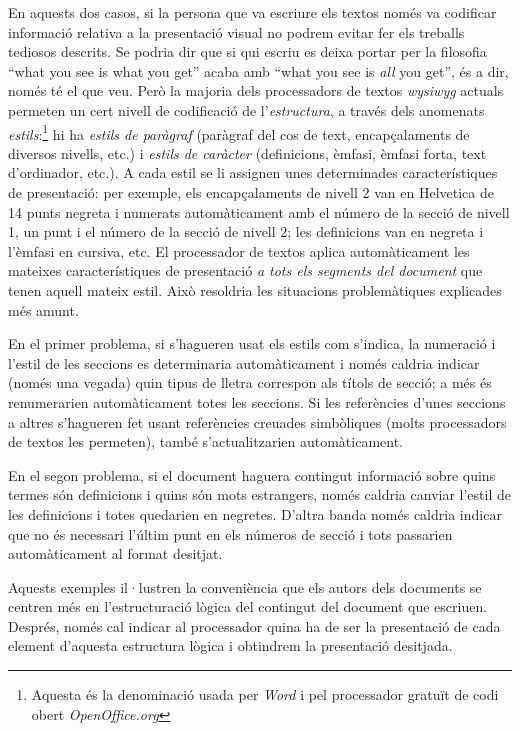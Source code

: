   En aquests dos casos, si la persona que va escriure els textos només
  va codificar informació relativa a la presentació visual no podrem
  evitar fer els treballs tediosos descrits. Se podria dir que si qui
  escriu es deixa portar per la filosofia ``what you see is what you
  get'' acaba amb ``what you see is \emph{all} you get'', és a dir,
  només té el que veu. Però la majoria dels processadors de textos
  \emph{wysiwyg} actuals permeten un cert nivell de codificació de
  l'\emph{estructura}, a través dels anomenats
  \emph{estils}:\footnote{Aquesta és la denominació usada per
    \emph{Word} i pel processador gratuït de codi obert
    \emph{OpenOffice.org}} hi ha \emph{estils de paràgraf} (paràgraf
  del cos de text, encapçalaments de diversos nivells, etc.) i
  \emph{estils de caràcter} (definicions, èmfasi, èmfasi forta, text
  d'ordinador, etc.).\label{pg:estil} A cada estil se li assignen unes determinades
  característiques de presentació: per exemple, els encapçalaments de
  nivell 2 van en Helvetica de 14 punts negreta i numerats
  automàticament amb el número de la secció de nivell 1, un punt i el
  número de la secció de nivell 2; les definicions van en negreta i
  l'èmfasi en cursiva, etc. El processador de textos aplica
  automàticament les mateixes característiques de presentació \emph{a
    tots els segments del document} que tenen aquell mateix estil.
  Això resoldria les situacions problemàtiques explicades més amunt.
  
  En el primer problema, si s'hagueren usat els estils com s'indica,
  la numeració i l'estil de les seccions es determinaria
  automàticament i només caldria indicar (només una vegada)
  quin tipus de lletra
  correspon als títols de secció; a més és renumerarien automàticament
  totes les seccions. Si les referències d'unes seccions a altres
  s'hagueren fet usant referències creuades simbòliques (molts
  processadors de textos les permeten), també s'actualitzarien
  automàticament.
  
  En el segon problema, si el document haguera contingut informació
  sobre quins termes són definicions i quins són mots estrangers,
  només caldria canviar l'estil de les definicions i totes quedarien
  en negretes. D'altra banda només caldria indicar que no és necessari
  l'últim punt en els números de secció i tots passarien
  automàticament al format desitjat.
  
  Aquests exemples il·lustren la conveniència que els autors dels
  documents se centren més en l'estructuració lògica del contingut del
  document que escriuen. Després, només cal indicar al processador
  quina ha de ser la presentació de cada element d'aquesta estructura
  lògica i obtindrem la presentació desitjada.

